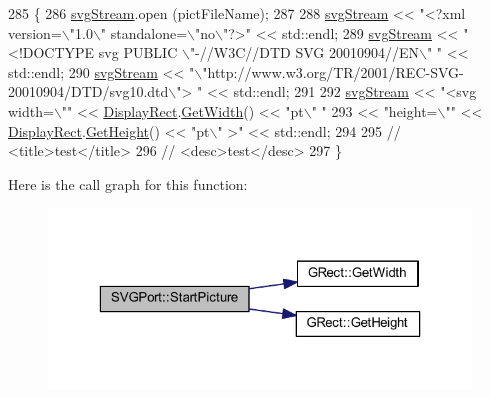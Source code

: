 \begin{DoxyCode}
285 \{
286     \mbox{\hyperlink{class_s_v_g_port_ad3e240ca528cd784e138dce907d5d45a}{svgStream}}.open (pictFileName);
287     
288     \mbox{\hyperlink{class_s_v_g_port_ad3e240ca528cd784e138dce907d5d45a}{svgStream}} << \textcolor{stringliteral}{"<?xml version=\(\backslash\)"1.0\(\backslash\)" standalone=\(\backslash\)"no\(\backslash\)"?>"} << std::endl;
289     \mbox{\hyperlink{class_s_v_g_port_ad3e240ca528cd784e138dce907d5d45a}{svgStream}} << \textcolor{stringliteral}{"<!DOCTYPE svg PUBLIC \(\backslash\)"-//W3C//DTD SVG 20010904//EN\(\backslash\)" "} << std::endl;
290     \mbox{\hyperlink{class_s_v_g_port_ad3e240ca528cd784e138dce907d5d45a}{svgStream}} << \textcolor{stringliteral}{"\(\backslash\)"http://www.w3.org/TR/2001/REC-SVG-20010904/DTD/svg10.dtd\(\backslash\)"> "} << std::endl;
291 
292     \mbox{\hyperlink{class_s_v_g_port_ad3e240ca528cd784e138dce907d5d45a}{svgStream}} << \textcolor{stringliteral}{"<svg width=\(\backslash\)""} << \mbox{\hyperlink{class_g_base_port_ac0e1180ebadeed5d3c7d0291db1bdf29}{DisplayRect}}.\mbox{\hyperlink{class_g_rect_af36a407452070f2e93a25dbafd3b4314}{GetWidth}}() << \textcolor{stringliteral}{"pt\(\backslash\)" "}
293         << \textcolor{stringliteral}{"height=\(\backslash\)""} << \mbox{\hyperlink{class_g_base_port_ac0e1180ebadeed5d3c7d0291db1bdf29}{DisplayRect}}.\mbox{\hyperlink{class_g_rect_a8d2b0a2c06688c2dad74bd0789f57d73}{GetHeight}}() << \textcolor{stringliteral}{"pt\(\backslash\)" >"} << std::endl;
294         
295 \textcolor{comment}{// <title>test</title>}
296 \textcolor{comment}{// <desc>test</desc>}
297 \}
\end{DoxyCode}
Here is the call graph for this function\+:\nopagebreak
\begin{figure}[H]
\begin{center}
\leavevmode
\includegraphics[width=323pt]{class_s_v_g_port_a930228d552d729c5aeb0aa8fb731d303_cgraph}
\end{center}
\end{figure}


